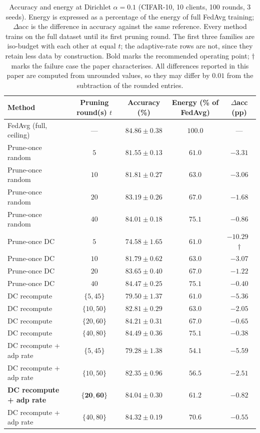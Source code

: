 \documentclass[conference]{IEEEtran}
\begin{document}
\begin{table}[t]
\caption{Accuracy and energy at Dirichlet $\alpha=0.1$ (CIFAR-10, 10 clients, 100 rounds, 3 seeds). Energy is expressed as a percentage of the energy of full FedAvg training; $\Delta$acc is the difference in accuracy against the same reference. Every method trains on the full dataset until its first pruning round. The first three families are iso-budget with each other at equal $t$; the adaptive-rate rows are not, since they retain less data by construction. Bold marks the recommended operating point; $\dagger$ marks the failure case the paper characterises. All differences reported in this paper are computed from unrounded values, so they may differ by $0.01$ from the subtraction of the rounded entries.}
\label{tab:main}
\begin{center}
\renewcommand{\arraystretch}{1.0}
\setlength{\tabcolsep}{8pt}
\begin{tabular}{lcccc}
\hline
\textbf{Method} & \textbf{Pruning round(s) $t$} & \textbf{Accuracy (\%)} & \textbf{Energy (\% of FedAvg)} & \textbf{$\Delta$acc (pp)} \\
\hline
FedAvg (full, ceiling) & --- & $84.86 \pm 0.38$ & $100.0$ & --- \\
\hline
Prune-once random & $5$ & $81.55 \pm 0.13$ & $61.0$ & $-3.31$ \\
Prune-once random & $10$ & $81.81 \pm 0.27$ & $63.0$ & $-3.06$ \\
Prune-once random & $20$ & $83.19 \pm 0.26$ & $67.0$ & $-1.68$ \\
Prune-once random & $40$ & $84.01 \pm 0.18$ & $75.1$ & $-0.86$ \\
\hline
Prune-once DC & $5$ & $74.58 \pm 1.65$ & $61.0$ & $-10.29$~$\dagger$ \\
Prune-once DC & $10$ & $81.79 \pm 0.62$ & $63.0$ & $-3.07$ \\
Prune-once DC & $20$ & $83.65 \pm 0.40$ & $67.0$ & $-1.22$ \\
Prune-once DC & $40$ & $84.47 \pm 0.25$ & $75.1$ & $-0.40$ \\
\hline
DC recompute & $\{5,45\}$ & $79.50 \pm 1.37$ & $61.0$ & $-5.36$ \\
DC recompute & $\{10,50\}$ & $82.81 \pm 0.29$ & $63.0$ & $-2.05$ \\
DC recompute & $\{20,60\}$ & $84.21 \pm 0.31$ & $67.0$ & $-0.65$ \\
DC recompute & $\{40,80\}$ & $84.49 \pm 0.36$ & $75.1$ & $-0.38$ \\
\hline
DC recompute + adp rate & $\{5,45\}$ & $79.28 \pm 1.38$ & $54.1$ & $-5.59$ \\
DC recompute + adp rate & $\{10,50\}$ & $82.35 \pm 0.96$ & $56.5$ & $-2.51$ \\
\textbf{DC recompute + adp rate} & $\mathbf{\{20,60\}}$ & $\mathbf{84.04 \pm 0.30}$ & $\mathbf{61.2}$ & $\mathbf{-0.82}$ \\
DC recompute + adp rate & $\{40,80\}$ & $84.32 \pm 0.19$ & $70.6$ & $-0.55$ \\
\hline
\end{tabular}
\end{center}
\end{table}
\end{document}
